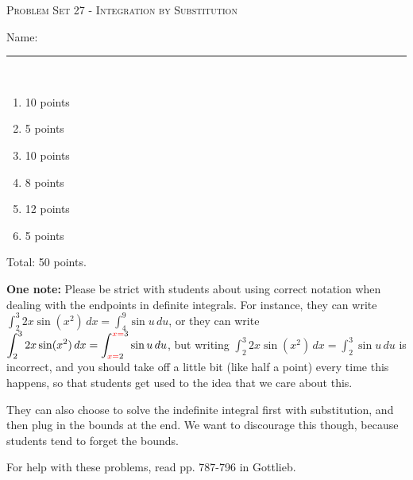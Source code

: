 \documentclass{article}
\begin{document}
\begin{center}
  \large\textsc{Problem Set 27 - Integration by Substitution}
  
      \pspace{12pt}
  \begin{problemonly}\large Name: \rule{5cm}{0.15mm}\\ \end{problemonly}
\end{center}

\begin{grading}
  \begin{enumerate}
    \item 10 points
    \item 5 points
    \item 10 points
    \item 8 points
    \item 12 points
    \item 5 points
\end{enumerate}
Total: 50 points.
  

  \textbf{One note:} Please be strict with students about using correct notation
  when dealing with the endpoints in definite integrals.  For instance,
  they can write $\displaystyle \int_2^3 2x \sin(x^2)\,dx = \int_4^9 \sin
  u\,du$, or they can write $\displaystyle \int_2^3 2x \sin (x^2)\,dx =
  \int_{{\color{red}x=\color{black}2}}^{{\color{red}x=\color{black}3}}
  \sin u\,du$, but writing $\displaystyle \int_2^3 2x \sin(x^2)\,dx =
  \int_2^3 \sin u\,du$ is incorrect, and you should take off a little bit
  (like half a point) every time this happens, so that students get used
  to the idea that we care about this.

  They can also choose to solve the indefinite integral first with substitution, and then plug in the bounds at the end. We want to discourage this though, because students tend to forget the bounds.
\end{grading}

For help with these problems, read pp. 787-796 in Gottlieb.
\end{document}
